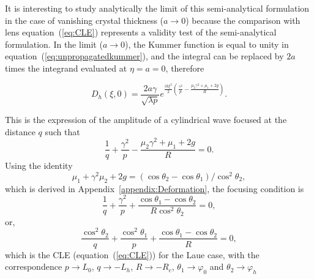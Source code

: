 \documentclass[preprint]{iucr}              %
\newcommand{\inred}[1]{{\color{red}#1}}
\begin{document}
\inred{It is interesting to study analytically the limit of this semi-analytical formulation in the case of}
vanishing crystal thickness ($a\rightarrow0{}$) \inred{because the comparison with lens equation~(\ref{eq:CLE}) represents a validity test of the semi-analytical formulation. 
In the limit ($a\rightarrow0{}$),}
the Kummer function is equal to unity in equation~(\ref{eq:unpropagatedkummer}), and the integral can be replaced by $2a$ times the integrand evaluated at $\eta=a=0$, therefore


\begin{equation}
\label{eq:14reduced}
    D_h(\xi,0) = \frac{2 a \gamma}{\sqrt{\lambda p}} e^{\frac{i k \xi^2}{2}(\frac{\gamma^2}{p}-\frac{\mu_2\gamma^2+\mu_1+2g}{R})}.
\end{equation}

This is the expression of the amplitude of a cylindrical wave focused at the distance $q$ such that
\begin{equation}
    \frac{1}{q}+\frac{\gamma^2}{p}-\frac{\mu_2\gamma^2+\mu_1+2g}{R}=0. 
\end{equation}
Using the identity
\begin{equation}
\label{eq:appendixIdentity}
    \mu_1+\gamma^2\mu_2+2g=(\cos\theta_2-\cos\theta_1)/\cos^2\theta_2,
\end{equation}
which is \inred{derived} in Appendix~\ref{appendix:Deformation}, the focusing condition is 
\begin{equation}
    \frac{1}{q}+\frac{\gamma^2}{p}+\frac{\cos\theta_1-\cos\theta_2}{R\cos^2\theta_2}=0,
\end{equation}
or,
\begin{equation}
    \frac{\cos^2\theta_2}{q}+\frac{\cos^2\theta_1}{p}+\frac{\cos\theta_1-\cos\theta_2}{R}=0,
\end{equation}
which is the CLE (equation~(\ref{eq:CLE})) for the Laue case, with the correspondence $p \rightarrow L_0$, $q \rightarrow -L_h$, $R \rightarrow -R_c$, $\theta_1 \rightarrow \varphi_0$ and $\theta_2 \rightarrow \varphi_h$
\end{document}
